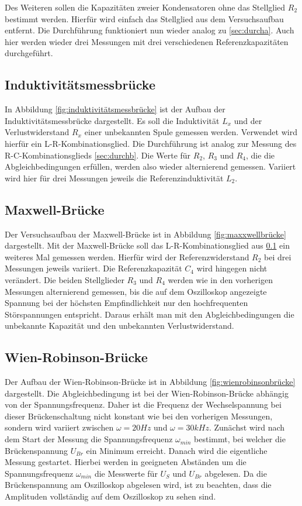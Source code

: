 Des Weiteren sollen die Kapazitäten zweier Kondensatoren ohne das Stellglied $R_2$ bestimmt werden.
Hierfür wird einfach das Stellglied aus dem Versuchsaufbau entfernt.
Die Durchführung funktioniert nun wieder analog zu \ref{sec:durcha}.
Auch hier werden wieder drei Messungen mit drei verschiedenen Referenzkapazitäten durchgeführt.

\subsection{Induktivitätsmessbrücke}
\label{sec:durchc}

In Abbildung \ref{fig:induktivitätsmessbrücke} ist der Aufbau der Induktivitätsmessbrücke dargestellt.
Es soll die Induktivität $L_x$ und der Verlustwiderstand $R_x$ einer unbekannten Spule gemessen werden.
Verwendet wird hierfür ein L-R-Kombinationsglied.
Die Durchführung ist analog zur Messung des R-C-Kombinationsglieds \ref{sec:durchb}.
Die Werte für $R_2$, $R_3$ und $R_4$, die die Abgleichbedingungen erfüllen, werden also wieder alternierend gemessen.
Variiert wird hier für drei Messungen jeweils die Referenzinduktivität $L_2$.

\subsection{Maxwell-Brücke}

Der Versuchsaufbau der Maxwell-Brücke ist in Abbildung \ref{fig:maxxwellbrücke} dargestellt.
Mit der Maxwell-Brücke soll das L-R-Kombinationsglied aus \ref{sec:durchc} ein weiteres Mal gemessen werden.
Hierfür wird der Referenzwiderstand $R_2$ bei drei Messungen jeweils variiert.
Die Referenzkapazität $C_4$ wird hingegen nicht verändert.
Die beiden Stellglieder $R_3$ und $R_4$ werden wie in den vorherigen Messungen alternierend gemessen, bis die auf dem Oszilloskop angezeigte Spannung bei der höchsten Empfindlichkeit nur den hochfrequenten Störspannungen entspricht.
Daraus erhält man mit den Abgleichbedingungen die unbekannte Kapazität und den unbekannten Verlustwiderstand.

\subsection{Wien-Robinson-Brücke}
Der Aufbau der Wien-Robinson-Brücke ist in Abbildung \ref{fig:wienrobinsonbrücke} dargestellt.
Die Abgleichbedingung ist bei der Wien-Robinson-Brücke abhängig von der Spannungsfrequenz.
Daher ist die Frequenz der Wechselspannung bei dieser Brückenschaltung nicht konstant wie
bei den vorherigen Messungen, sondern wird variiert zwischen $\omega = 20 Hz$ und $\omega = 30kHz$.
Zunächst wird nach dem Start der Messung die Spannungsfrequenz $\omega_{min}$ bestimmt, bei welcher die Brückenspannung $U_{Br}$ ein Minimum erreicht.
Danach wird die eigentliche Messung gestartet.
Hierbei werden in geeigneten Abständen um die Spannungsfrequenz $\omega_{min}$ die Messwerte für $U_S$ und $U_{Br}$ abgelesen.
Da die Brückenspannung am Oszilloskop abgelesen wird, ist zu beachten, dass die Amplituden vollständig auf dem Oszilloskop zu sehen sind.
\newpage
